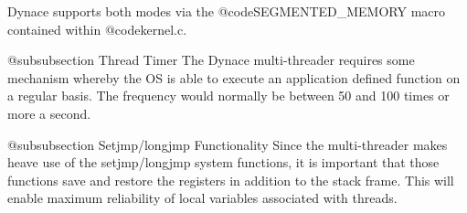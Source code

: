 Dynace supports both modes via the @code{SEGMENTED_MEMORY} macro
contained within @code{kernel.c}.


@subsubsection Thread Timer
The Dynace multi-threader requires some mechanism whereby the OS
is able to execute an application defined function on a regular
basis.  The frequency would normally be between 50 and 100 times or
more a second.

@subsubsection Setjmp/longjmp Functionality
Since the multi-threader makes heave use of the setjmp/longjmp
system functions, it is important that those functions save and
restore the registers in addition to the stack frame.  This will
enable maximum reliability of local variables associated with
threads.
